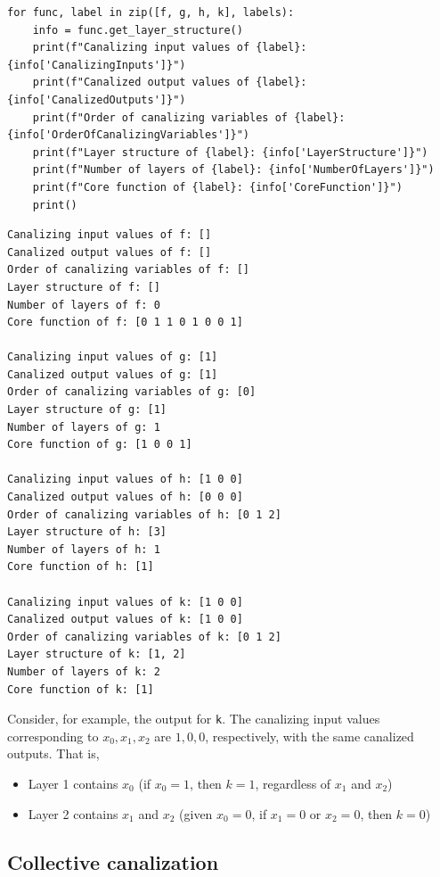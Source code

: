 \documentclass[
]{article}
\providecommand{\tightlist}{%
  \setlength{\itemsep}{0pt}\setlength{\parskip}{0pt}}
\begin{document}
\begin{lstlisting}
for func, label in zip([f, g, h, k], labels):
    info = func.get_layer_structure()
    print(f"Canalizing input values of {label}: {info['CanalizingInputs']}")
    print(f"Canalized output values of {label}: {info['CanalizedOutputs']}")
    print(f"Order of canalizing variables of {label}: {info['OrderOfCanalizingVariables']}")
    print(f"Layer structure of {label}: {info['LayerStructure']}")
    print(f"Number of layers of {label}: {info['NumberOfLayers']}")
    print(f"Core function of {label}: {info['CoreFunction']}")
    print()
\end{lstlisting}

\begin{lstlisting}
Canalizing input values of f: []
Canalized output values of f: []
Order of canalizing variables of f: []
Layer structure of f: []
Number of layers of f: 0
Core function of f: [0 1 1 0 1 0 0 1]

Canalizing input values of g: [1]
Canalized output values of g: [1]
Order of canalizing variables of g: [0]
Layer structure of g: [1]
Number of layers of g: 1
Core function of g: [1 0 0 1]

Canalizing input values of h: [1 0 0]
Canalized output values of h: [0 0 0]
Order of canalizing variables of h: [0 1 2]
Layer structure of h: [3]
Number of layers of h: 1
Core function of h: [1]

Canalizing input values of k: [1 0 0]
Canalized output values of k: [1 0 0]
Order of canalizing variables of k: [0 1 2]
Layer structure of k: [1, 2]
Number of layers of k: 2
Core function of k: [1]
\end{lstlisting}

Consider, for example, the output for \texttt{k}. The canalizing input
values corresponding to \(x_0, x_1, x_2\) are \(1,0,0\), respectively,
with the same canalized outputs. That is,

\begin{itemize}
\tightlist
\item
  Layer 1 contains \(x_0\) (if \(x_0=1\), then \(k=1\), regardless of
  \(x_1\) and \(x_2\))
\item
  Layer 2 contains \(x_1\) and \(x_2\) (given \(x_0=0\), if \(x_1=0\) or
  \(x_2=0\), then \(k=0\))
\end{itemize}

\subsection{Collective canalization}\label{collective-canalization}
\end{document}
